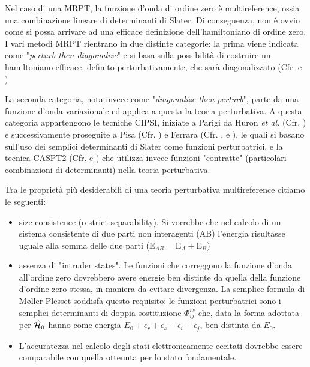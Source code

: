 Nel caso di una MRPT, la funzione d'onda di ordine zero \`e multireference,
ossia una combinazione lineare di determinanti di Slater. Di conseguenza,
non \`e ovvio come si possa arrivare ad una efficace definizione
dell'hamiltoniano di ordine zero. I vari metodi MRPT rientrano in due
distinte categorie: la prima viene indicata come "\textit{perturb then diagonalize}"
e si basa sulla possibilit\`a di costruire un hamiltoniano efficace,
definito perturbativamente, che sar\`a diagonalizzato (Cfr. \cite{rmp-39-1967-771} e
\cite{jpa-18-1985-809})

La seconda categoria, nota invece come "\textit{diagonalize then perturb}",
parte da una funzione d'onda variazionale ed applica a questa la teoria
perturbativa. A questa categoria appartengono le tecniche CIPSI, iniziate a
Parigi da Huron \textit{et al.} (Cfr. \cite{jcp-58-1973-5745}) e
successivamente proseguite a Pisa (Cfr. \cite{jcc-8-1987-39}) e 
Ferrara (Cfr. \cite{ijqc-60-1996-167}, \cite{tca-98-1997-57} e
\cite{tca-98-1997-117}), le quali si basano sull'uso
dei semplici determinanti di Slater come funzioni perturbatrici, e la
tecnica CASPT2 (Cfr. \cite{jpc-94-1990-5483} e \cite{jcp-96-1992-1218}) che
utilizza invece funzioni "contratte" (particolari combinazioni di
determinanti) nella teoria perturbativa.

Tra le propriet\`a pi\`u desiderabili di una teoria perturbativa
multireference citiamo le seguenti:
\begin{itemize}
\item size consistence (o strict separability). Si vorrebbe che nel calcolo
di un sistema consistente di due parti non interagenti (AB) l'energia
risultasse uguale alla somma delle due parti (E$_{AB} = $E$_A + $E$_B$)
\item assenza di "intruder states". Le funzioni che correggono la funzione
d'onda all'ordine zero dovrebbero avere energie ben distinte da quella della
funzione d'ordine zero stessa, in maniera da evitare divergenza. La semplice
formula di M{\o}ller-Plesset soddisfa questo requisito: le funzioni
perturbatrici sono i semplici determinanti di doppia sostituzione
$\Phi_{ij}^{rs}$ che, data la forma adottata per $\hat{\mathcal{H}}_0$ hanno come energia
$E_0 + \epsilon_r + \epsilon_s - \epsilon_i - \epsilon_j$, ben distinta da
$E_0$.
\item L'accuratezza nel calcolo degli stati elettronicamente eccitati
dovrebbe essere comparabile con quella ottenuta per lo stato fondamentale.
\end{itemize}

